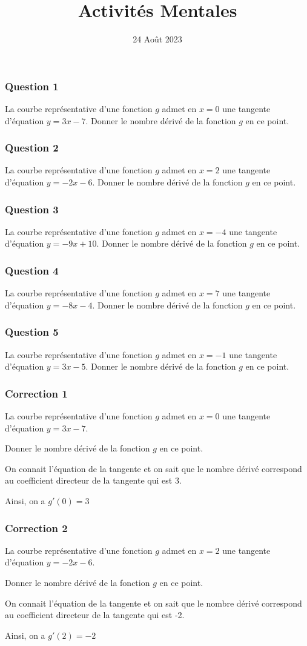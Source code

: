 \documentclass[15pt, mathserif]{beamer}
\title{Activités Mentales}
\date{24 Août 2023}
\begin{document}
\begin{frame}
    \titlepage
\end{frame}

\begin{frame} 
	\frametitle{Question 1}
La courbe représentative d'une fonction $g$ admet en $x=0$ une tangente d'équation $y=3x-7$. Donner le nombre dérivé de la fonction $g$ en ce point.\end{frame}


\begin{frame} 
	\frametitle{Question 2}
La courbe représentative d'une fonction $g$ admet en $x=2$ une tangente d'équation $y=-2x-6$. Donner le nombre dérivé de la fonction $g$ en ce point.\end{frame}


\begin{frame} 
	\frametitle{Question 3}
La courbe représentative d'une fonction $g$ admet en $x=-4$ une tangente d'équation $y=-9x+10$. Donner le nombre dérivé de la fonction $g$ en ce point.\end{frame}


\begin{frame} 
	\frametitle{Question 4}
La courbe représentative d'une fonction $g$ admet en $x=7$ une tangente d'équation $y=-8x-4$. Donner le nombre dérivé de la fonction $g$ en ce point.\end{frame}


\begin{frame} 
	\frametitle{Question 5}
La courbe représentative d'une fonction $g$ admet en $x=-1$ une tangente d'équation $y=3x-5$. Donner le nombre dérivé de la fonction $g$ en ce point.\end{frame}


\begin{frame}
\vspace{-10mm}
	\frametitle{Correction 1}
La courbe représentative d'une fonction $g$ admet en $x=0$ une tangente d'équation $y=3x-7$.
 
  Donner le nombre dérivé de la fonction $g$ en ce point. 
 
 On connait l'équation de la tangente et on sait que le nombre dérivé correspond au coefficient directeur de la tangente qui est 3. 
 
 Ainsi, on a $g'(0)=3$\end{frame}


\begin{frame}
\vspace{-10mm}
	\frametitle{Correction 2}
La courbe représentative d'une fonction $g$ admet en $x=2$ une tangente d'équation $y=-2x-6$.
 
  Donner le nombre dérivé de la fonction $g$ en ce point. 
 
 On connait l'équation de la tangente et on sait que le nombre dérivé correspond au coefficient directeur de la tangente qui est -2. 
 
 Ainsi, on a $g'(2)=-2$\end{frame}
\end{document}
